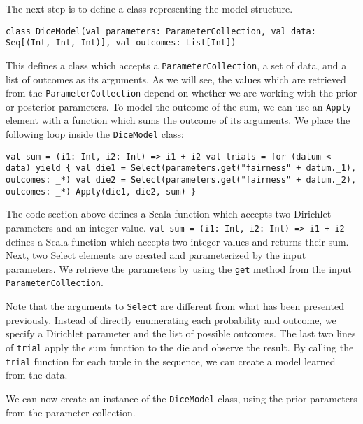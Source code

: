 The next step is to define a class representing the model structure.

\begin{flushleft}
\texttt{class DiceModel(val parameters: ParameterCollection, val data: Seq[(Int, Int, Int)], val outcomes: List[Int])}
\end{flushleft}

This defines a class which accepts a \texttt{ParameterCollection}, a set of data, and a list of outcomes as its arguments. As we will see, the values which are retrieved from the \texttt{ParameterCollection} depend on whether we are working with the prior or posterior parameters. To model the outcome of the sum, we can use an \texttt{Apply} element with a function which sums the outcome of its arguments. We place the following loop inside the \texttt{DiceModel} class:

\begin{flushleft}
\texttt{val sum = (i1: Int, i2: Int) => i1 + i2
	\newline val trials = for (datum <- data) yield \{
    \newline \tab val die1 = Select(parameters.get("fairness" + datum.\_1), outcomes: \_*)
    \newline \tab val die2 = Select(parameters.get("fairness" + datum.\_2), outcomes: \_*)
    \newline \tab Apply(die1, die2, sum)
	\newline \}
  }
\end{flushleft}

The code section above defines a Scala function which accepts two Dirichlet parameters and an integer value. \texttt{val sum = (i1: Int, i2: Int) => i1 + i2} defines a Scala function which accepts two integer values and returns their sum.  Next, two Select elements are created and parameterized by the input parameters. We retrieve the parameters by using the \texttt{get} method from the input \texttt{ParameterCollection}.

Note that the arguments to \texttt{Select} are different from what has been presented previously. Instead of directly enumerating each probability and outcome, we specify a Dirichlet parameter and the list of possible outcomes. The last two lines of \texttt{trial} apply the sum function to the die and observe the result. By calling the \texttt{trial} function for each tuple in the sequence, we can create a model learned from the data.

We can now create an instance of the \texttt{DiceModel} class, using the prior parameters from the parameter collection. 

